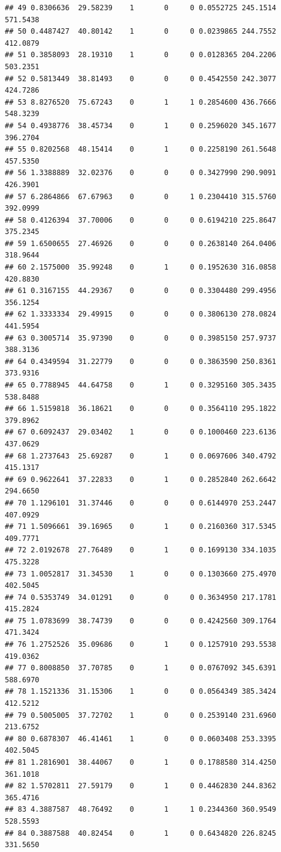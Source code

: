 \documentclass[]{article}
\begin{document}
\begin{verbatim}
## 49 0.8306636  29.58239    1       0     0 0.0552725 245.1514 571.5438
## 50 0.4487427  40.80142    1       0     0 0.0239865 244.7552 412.0879
## 51 0.3858093  28.19310    1       0     0 0.0128365 204.2206 503.2351
## 52 0.5813449  38.81493    0       0     0 0.4542550 242.3077 424.7286
## 53 8.8276520  75.67243    0       1     1 0.2854600 436.7666 548.3239
## 54 0.4938776  38.45734    0       1     0 0.2596020 345.1677 396.2704
## 55 0.8202568  48.15414    0       1     0 0.2258190 261.5648 457.5350
## 56 1.3388889  32.02376    0       0     0 0.3427990 290.9091 426.3901
## 57 6.2864866  67.67963    0       0     1 0.2304410 315.5760 392.0999
## 58 0.4126394  37.70006    0       0     0 0.6194210 225.8647 375.2345
## 59 1.6500655  27.46926    0       0     0 0.2638140 264.0406 318.9644
## 60 2.1575000  35.99248    0       1     0 0.1952630 316.0858 420.8830
## 61 0.3167155  44.29367    0       0     0 0.3304480 299.4956 356.1254
## 62 1.3333334  29.49915    0       0     0 0.3806130 278.0824 441.5954
## 63 0.3005714  35.97390    0       0     0 0.3985150 257.9737 388.3136
## 64 0.4349594  31.22779    0       0     0 0.3863590 250.8361 373.9316
## 65 0.7788945  44.64758    0       1     0 0.3295160 305.3435 538.8488
## 66 1.5159818  36.18621    0       0     0 0.3564110 295.1822 379.8962
## 67 0.6092437  29.03402    1       0     0 0.1000460 223.6136 437.0629
## 68 1.2737643  25.69287    0       1     0 0.0697606 340.4792 415.1317
## 69 0.9622641  37.22833    0       1     0 0.2852840 262.6642 294.6650
## 70 1.1296101  31.37446    0       0     0 0.6144970 253.2447 407.0929
## 71 1.5096661  39.16965    0       1     0 0.2160360 317.5345 409.7771
## 72 2.0192678  27.76489    0       1     0 0.1699130 334.1035 475.3228
## 73 1.0052817  31.34530    1       0     0 0.1303660 275.4970 402.5045
## 74 0.5353749  34.01291    0       0     0 0.3634950 217.1781 415.2824
## 75 1.0783699  38.74739    0       0     0 0.4242560 309.1764 471.3424
## 76 1.2752526  35.09686    0       1     0 0.1257910 293.5538 419.0362
## 77 0.8008850  37.70785    0       1     0 0.0767092 345.6391 588.6970
## 78 1.1521336  31.15306    1       0     0 0.0564349 385.3424 412.5212
## 79 0.5005005  37.72702    1       0     0 0.2539140 231.6960 213.6752
## 80 0.6878307  46.41461    1       0     0 0.0603408 253.3395 402.5045
## 81 1.2816901  38.44067    0       1     0 0.1788580 314.4250 361.1018
## 82 1.5702811  27.59179    0       1     0 0.4462830 244.8362 365.4716
## 83 4.3887587  48.76492    0       1     1 0.2344360 360.9549 528.5593
## 84 0.3887588  40.82454    0       1     0 0.6434820 226.8245 331.5650

\end{verbatim}
\end{document}
